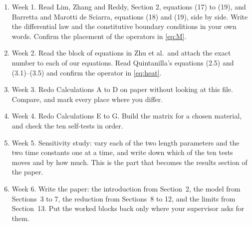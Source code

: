 \documentclass[11pt,a4paper]{article}
\begin{document}
\begin{enumerate}
\item Week 1. Read Lim, Zhang and Reddy, Section 2, equations (17) to (19), and Barretta and Marotti de
Sciarra, equations (18) and (19), side by side. Write the differential law and the constitutive boundary
conditions in your own words. Confirm the placement of the operators in \eqref{eq:M}.
\item Week 2. Read the block of equations in Zhu et al.\ and attach the exact number to each of our
equations. Read Quintanilla's equations (2.5) and (3.1)--(3.5) and confirm the operator in \eqref{eq:heat}.
\item Week 3. Redo Calculations A to D on paper without looking at this file. Compare, and mark every place
where you differ.
\item Week 4. Redo Calculations E to G. Build the matrix for a chosen material, and check the ten self-tests
in order.
\item Week 5. Sensitivity study: vary each of the two length parameters and the two time constants one at a
time, and write down which of the ten tests moves and by how much. This is the part that becomes the results
section of the paper.
\item Week 6. Write the paper: the introduction from Section~2, the model from Sections~3 to 7, the
reduction from Sections~8 to 12, and the limits from Section~13. Put the worked blocks back only where your
supervisor asks for them.
\end{enumerate}



\end{document}
